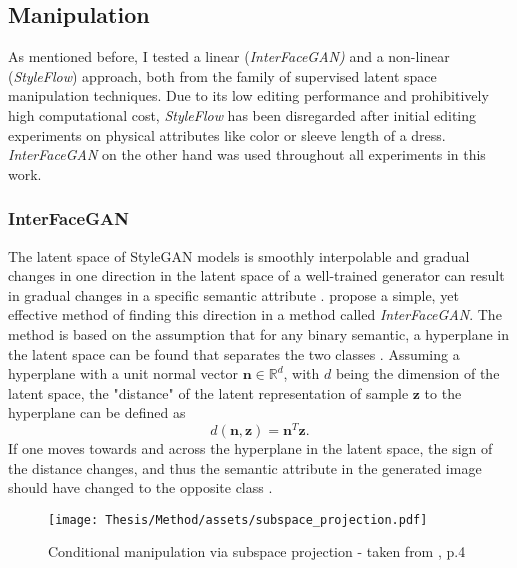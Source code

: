 \subsection{Manipulation}\label{sec:manipulation}
As mentioned before, I tested a linear (\textit{InterFaceGAN)} and a non-linear (\textit{StyleFlow}) approach, both from the family of supervised latent space manipulation techniques. Due to its low editing performance and prohibitively high computational cost, \textit{StyleFlow} has been disregarded after initial editing experiments on physical attributes like color or sleeve length of a dress. \textit{InterFaceGAN} on the other hand was used throughout all experiments in this work.

\subsubsection{InterFaceGAN}\label{sec:interfacegan}
The latent space of StyleGAN models is smoothly interpolable \citep[p.1]{stylegan1} and gradual changes in one direction in the latent space of a well-trained generator can result in gradual changes in a specific semantic attribute \citep[p.6]{bermano2022state}. \cite{shen2020interpreting} propose a simple, yet effective method of finding this direction in a method called \textit{InterFaceGAN}. The method is based on the assumption that for any binary semantic, a hyperplane in the latent space can be found that separates the two classes \citep[p.3]{shen2020interpreting}. Assuming a hyperplane with a unit normal vector $\mathbf{n} \in \mathbb{R}^d$, with $d$ being the dimension of the latent space, the "distance" of the latent representation of sample $\mathbf{z}$ to the hyperplane can be defined as 
\[d(\mathbf{n, z}) = \mathbf{n}^T\mathbf{z}.\]
If one moves towards and across the hyperplane in the latent space, the sign of the distance changes, and thus the semantic attribute in the generated image should have changed to the opposite class \citep[p.3]{shen2020interpreting}. 

\begin{wrapfigure}{r}{6cm}
    \texttt{[image: Thesis/Method/assets/subspace\_projection.pdf]}
    \caption[Conditional manipulation via subspace projection]{Conditional manipulation via subspace projection - taken from \cite{shen2020interpreting}, p.4}
    \label{fig:subspace_projection}
\end{wrapfigure} 

